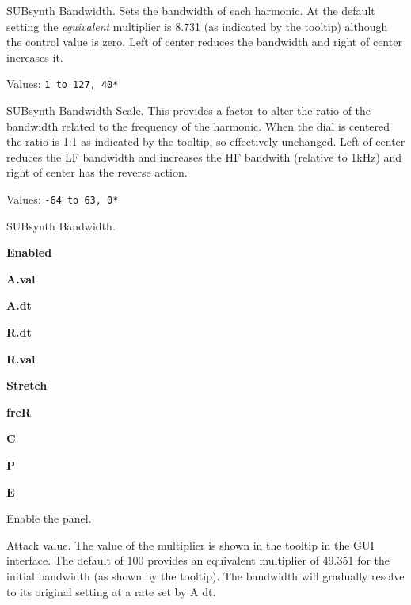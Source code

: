    \setcounter{ItemCounter}{0}      %

   SUBsynth Bandwidth.
   Sets the bandwidth of each harmonic.
   At the default setting the \textsl{equivalent} multiplier is 8.731 (as
   indicated by the tooltip) although the control value is zero. Left of center
   reduces the bandwidth and right of center increases it.

   Values: \texttt{1 to 127, 40*}

   SUBsynth Bandwidth Scale.
   This provides a factor to alter the ratio of the bandwidth related to the
   frequency of the harmonic. When the dial is centered the ratio is 1:1 as
   indicated by the tooltip, so effectively unchanged. Left of center reduces
   the LF bandwidth and increases the HF bandwith (relative to 1kHz) and right
   of center has the reverse action.

   Values: \texttt{-64 to 63, 0*}

   SUBsynth Bandwidth.

   \begin{enumber}
      \item \textbf{Enabled}
      \item \textbf{A.val}
      \item \textbf{A.dt}
      \item \textbf{R.dt}
      \item \textbf{R.val}
      \item \textbf{Stretch}
      \item \textbf{frcR}
      \item \textbf{C}
      \item \textbf{P}
      \item \textbf{E}
   \end{enumber}

   \setcounter{ItemCounter}{0}      %

   Enable the panel.

   Attack value.
   The value of the multiplier is shown in the tooltip in the GUI interface.
   The default of 100 provides an equivalent multiplier of 49.351 for the
   initial bandwidth (as shown by the tooltip). The bandwidth will gradually
   resolve to its original setting at a rate set by A dt.

